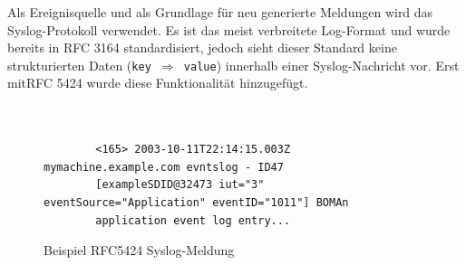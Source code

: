 Als Ereignisquelle und als Grundlage für neu generierte Meldungen wird das 
Syslog-Protokoll verwendet. Es ist das meist verbreitete Log-Format und wurde 
bereits in RFC 3164 standardisiert, jedoch sieht dieser Standard keine strukturierten 
Daten (\texttt{key $\Rightarrow$ value}) innerhalb einer Syslog-Nachricht vor. 
Erst mit\linebreak RFC 5424 \cite{rfc5424} wurde diese Funktionalität hinzugefügt.

\begin{table}[ht]
    \caption{Aufbau RFC 5424}
    \label{table:rfc5424}\vspace{0.2cm}
\end{table}

\newpage

\begin{figure}[h]
    \caption{Beispiel RFC5424 Syslog-Meldung}
    \label{log_example}\vspace{0.2cm}
    \centering
    \begin{shaded*}
    \small{
        \begin{verbatim}
        
        
        <165> 2003-10-11T22:14:15.003Z mymachine.example.com evntslog - ID47 
        [exampleSDID@32473 iut="3" eventSource="Application" eventID="1011"] BOMAn 
        application event log entry...
        \end{verbatim}}
    \end{shaded*}
\end{figure}

